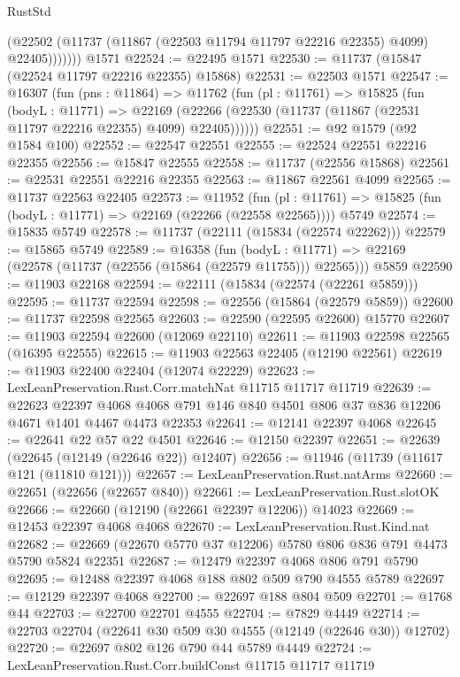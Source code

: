 \begin{lexlean}{RustStd}
\begin{coremodule}
              (@22502 (@11737 (@11867 (@22503 @11794 @11797 @22216 @22355) @4099) @22405)))))))
    @1571
@22524 := @22495 @1571
@22530 := @11737 (@15847 (@22524 @11797 @22216 @22355) @15868)
@22531 := @22503 @1571
@22547 := @16307
    (fun (pns : @11864) =>
    @11762
      (fun (pl : @11761) =>
      @15825
        (fun (bodyL : @11771) =>
        @22169 (@22266 (@22530 (@11737 (@11867 (@22531 @11797 @22216 @22355) @4099) @22405))))))
@22551 := @92 @1579 (@92 @1584 @100)
@22552 := @22547 @22551
@22555 := @22524 @22551 @22216 @22355
@22556 := @15847 @22555
@22558 := @11737 (@22556 @15868)
@22561 := @22531 @22551 @22216 @22355
@22563 := @11867 @22561 @4099
@22565 := @11737 @22563 @22405
@22573 := @11952
    (fun (pl : @11761) => @15825 (fun (bodyL : @11771) => @22169 (@22266 (@22558 @22565))))
    @5749
@22574 := @15835 @5749
@22578 := @11737 (@22111 (@15834 (@22574 @22262)))
@22579 := @15865 @5749
@22589 := @16358
    (fun (bodyL : @11771) => @22169 (@22578 (@11737 (@22556 (@15864 (@22579 @11755))) @22565)))
    @5859
@22590 := @11903 @22168
@22594 := @22111 (@15834 (@22574 (@22261 @5859)))
@22595 := @11737 @22594
@22598 := @22556 (@15864 (@22579 @5859))
@22600 := @11737 @22598 @22565
@22603 := @22590 (@22595 @22600) @15770
@22607 := @11903 @22594 @22600 (@12069 @22110)
@22611 := @11903 @22598 @22565 (@16395 @22555)
@22615 := @11903 @22563 @22405 (@12190 @22561)
@22619 := @11903 @22400 @22404 (@12074 @22229)
@22623 := LexLeanPreservation.Rust.Corr.matchNat @11715 @11717 @11719
@22639 := @22623
    @22397
    @4068
    @4068
    @791
    @146
    @840
    @4501
    @806
    @37
    @836
    @12206
    @4671
    @1401
    @4467
    @4473
    @22353
@22641 := @12141 @22397 @4068
@22645 := @22641 @22 @57 @22 @4501
@22646 := @12150 @22397
@22651 := @22639 (@22645 (@12149 (@22646 @22)) @12407)
@22656 := @11946 (@11739 (@11617 @121 (@11810 @121)))
@22657 := LexLeanPreservation.Rust.natArms
@22660 := @22651 (@22656 (@22657 @840))
@22661 := LexLeanPreservation.Rust.slotOK
@22666 := @22660 (@12190 (@22661 @22397 @12206)) @14023
@22669 := @12453 @22397 @4068 @4068
@22670 := LexLeanPreservation.Rust.Kind.nat
@22682 := @22669 (@22670 @5770 @37 @12206) @5780 @806 @836 @791 @4473 @5790 @5824 @22351
@22687 := @12479 @22397 @4068 @806 @791 @5790
@22695 := @12488 @22397 @4068 @188 @802 @509 @790 @4555 @5789
@22697 := @12129 @22397 @4068
@22700 := @22697 @188 @804 @509
@22701 := @1768 @44
@22703 := @22700 @22701 @4555
@22704 := @7829 @4449
@22714 := @22703 @22704 (@22641 @30 @509 @30 @4555 (@12149 (@22646 @30)) @12702)
@22720 := @22697 @802 @126 @790 @44 @5789 @4449
@22724 := LexLeanPreservation.Rust.Corr.buildConst @11715 @11717 @11719

\end{coremodule}
\end{lexlean}

